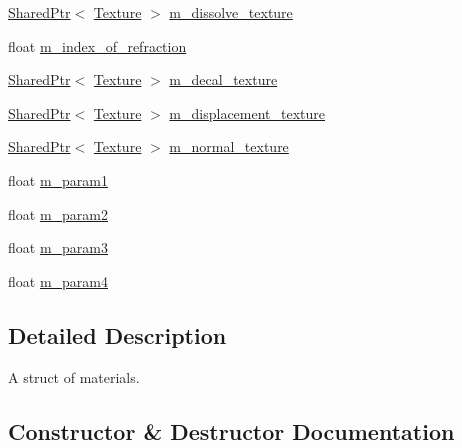 \begin{DoxyCompactItemize}
\item 
\hyperlink{namespacemage_a1e01ae66713838a7a67d30e44c67703e}{Shared\+Ptr}$<$ \hyperlink{classmage_1_1_texture}{Texture} $>$ \hyperlink{structmage_1_1_material_aa68e02ed3da6000effc3aadcc99fa4b5}{m\+\_\+dissolve\+\_\+texture}
\item 
float \hyperlink{structmage_1_1_material_a8b584541ab8bfc527f856c68bb0152e7}{m\+\_\+index\+\_\+of\+\_\+refraction}
\item 
\hyperlink{namespacemage_a1e01ae66713838a7a67d30e44c67703e}{Shared\+Ptr}$<$ \hyperlink{classmage_1_1_texture}{Texture} $>$ \hyperlink{structmage_1_1_material_acdab45e5d78ddbb7f717d9db67ff3fcf}{m\+\_\+decal\+\_\+texture}
\item 
\hyperlink{namespacemage_a1e01ae66713838a7a67d30e44c67703e}{Shared\+Ptr}$<$ \hyperlink{classmage_1_1_texture}{Texture} $>$ \hyperlink{structmage_1_1_material_a04ca0a2efe12529ae0ea91e9cb622ade}{m\+\_\+displacement\+\_\+texture}
\item 
\hyperlink{namespacemage_a1e01ae66713838a7a67d30e44c67703e}{Shared\+Ptr}$<$ \hyperlink{classmage_1_1_texture}{Texture} $>$ \hyperlink{structmage_1_1_material_a18e56785d5ca3ae5a9b99c64e70622d6}{m\+\_\+normal\+\_\+texture}
\item 
float \hyperlink{structmage_1_1_material_a1d715533a43b78bbae02b5e243d59f00}{m\+\_\+param1}
\item 
float \hyperlink{structmage_1_1_material_ac451f95eb5b81b6eaa834d9c038f4471}{m\+\_\+param2}
\item 
float \hyperlink{structmage_1_1_material_a725176729546010fa227b73ba3863e29}{m\+\_\+param3}
\item 
float \hyperlink{structmage_1_1_material_a5bdd53b39894a2f04cf68b03906ab149}{m\+\_\+param4}
\end{DoxyCompactItemize}


\subsection{Detailed Description}
A struct of materials. 

\subsection{Constructor \& Destructor Documentation}
\hypertarget{structmage_1_1_material_a0307d3bcf53c6ba270c8be4d127298db}{}\label{structmage_1_1_material_a0307d3bcf53c6ba270c8be4d127298db} 
